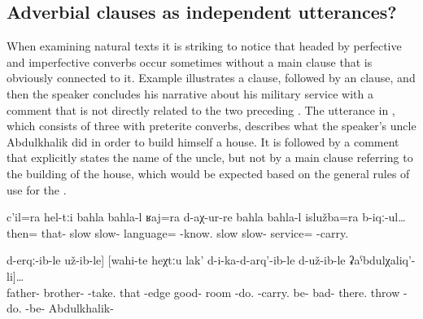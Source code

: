 \subsection{Adverbial clauses as independent utterances?}
\label{ssec:Adverbial clauses as independent utterances}

When examining natural texts it is striking to notice that  headed by perfective and imperfective converbs occur sometimes without a main clause that is obviously connected to it. Example  illustrates a  clause, followed by an  clause, and then the speaker concludes his narrative about his military service with a comment that is not directly related to the two preceding . The utterance in , which consists of three  with preterite converbs, describes what the speaker's uncle Abdulkhalik did in order to build himself a house. It is followed by a comment that explicitly states the name of the uncle, but not by a main clause referring to the building of the house, which would be expected based on the general rules of use for the .
%
\begin{exe}
	\ex	\label{ex:‎‎Then slowly I learned the language and I did my (military) service}
	\gll	c'il=ra	hel-tːi	bahla		bahla-l	ʁaj=ra	d-aχ-ur-re		bahla		bahla-l	islužba=ra b-iqː-ul\ldots\\
		then=		that-	slow		slow-	language=	-know.	slow	slow-	service= -carry.\\
	\glt	{} 

\ex	\label{ex:‎‎The brother of my father (= Abdulkhalik) tore down the wall}
\gll [di-la	atːa-la	ucːi-l	ha-b-ertː-ib-le	il	b-aʔ]		[ʡaˁħ-te	[cin-na	taχna	b-arq'-ij]	d-erqː-ib-le	už-ib-le]		[wahi-te	heχtːu	lak'	d-i-ka-d-arq'-ib-le	d-už-ib-le	ʡaˁbdulχaliq'-li]\ldots \\
	father-	brother-	-take.	that	-edge	good- 		room	-do.	-carry.	be-		bad- 	there.	throw	-do.	-be-	Abdulkhalik- \\
\glt	{}

\end{exe}

